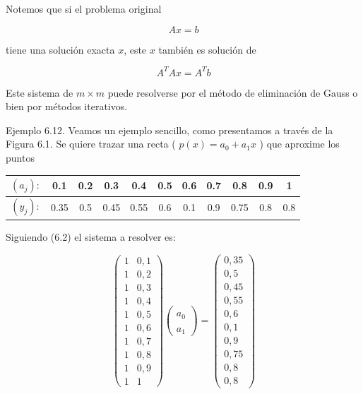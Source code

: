 \documentclass[10pt]{article}
\begin{document}
Notemos que si el problema original

$$
A x=b
$$

tiene una solución exacta $x$, este $x$ también es solución de

$$
A^{T} A x=A^{T} b
$$

Este sistema de $m \times m$ puede resolverse por el método de eliminación de Gauss o bien por métodos iterativos.

Ejemplo 6.12. Veamos un ejemplo sencillo, como presentamos a través de la Figura 6.1. Se quiere trazar una recta ( $p(x)=a_{0}+a_{1} x$ ) que aproxime los puntos

\begin{center}
\begin{tabular}{|c|c|c|c|c|c|c|c|c|c|c|}
\hline
$\left(a_{j}\right):$ & 0.1 & 0.2 & 0.3 & 0.4 & 0.5 & 0.6 & 0.7 & 0.8 & 0.9 & 1 \\
\hline
$\left(y_{j}\right):$ & 0.35 & 0.5 & 0.45 & 0.55 & 0.6 & 0.1 & 0.9 & 0.75 & 0.8 & 0.8 \\
\hline
\end{tabular}
\end{center}

Siguiendo (6.2) el sistema a resolver es:

$$
\left(\begin{array}{cc}
1 & 0,1 \\
1 & 0,2 \\
1 & 0,3 \\
1 & 0,4 \\
1 & 0,5 \\
1 & 0,6 \\
1 & 0,7 \\
1 & 0,8 \\
1 & 0,9 \\
1 & 1
\end{array}\right)\left(\begin{array}{l} 
\\
a_{0} \\
\\
a_{1}
\end{array}\right)=\left(\begin{array}{c}
0,35 \\
0,5 \\
0,45 \\
0,55 \\
0,6 \\
0,1 \\
0,9 \\
0,75 \\
0,8 \\
0,8
\end{array}\right)
$$
\end{document}

